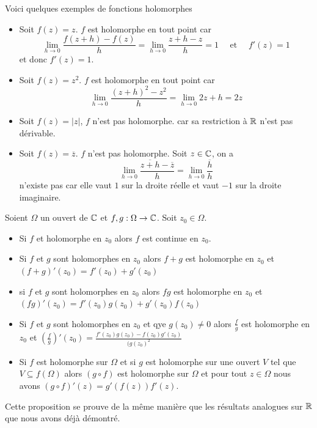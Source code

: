 \begin{exemple}
    Voici quelques exemples de fonctions holomorphes 
    \begin{itemize}
        \item Soit $f(z)=z$. $f$ est holomorphe en tout point car $$\lim_{h\to 0}\frac{f(z+h)- f(z)}{h}= \lim_{h\to 0}\frac{z+h-z}{h}=1\quad \text{ et } \quad f'(z)=1$$ et donc $f'(z) = 1$.
        \item Soit $f(z) = z^2$. $f$ est holomorphe en tout point car $$\lim_{h\to 0}\frac{(z+h)^2-z^2}{h} = \lim_{h\to 0}2z + h = 2z$$
        \item Soit $f(z)= |z|$, $f$ n'est pas holomorphe. car sa restriction à $\mathbb{R}$ n'est pas dérivable.
        \item Soit $f(z)= \overline{z}$. $f$ n'est pas holomorphe. Soit $z\in \mathbb{C}$, on a
        $$
        \lim_{h\to0}\frac{\overline{z+h}- \overline{z}}{h}=\lim_{h\to 0} \frac{\overline{h}}{h}
        $$ n'existe pas car elle vaut $1$ sur la droite réelle et vaut $-1$ sur la droite imaginaire.
    \end{itemize}
\end{exemple}
\begin{proposition}
    Soient $\Omega$ un ouvert de $\mathbb{C}$ et $f,g:\Omega \to \mathbb{C}$. Soit $z_0\in \Omega$.
    \begin{itemize}
        \item Si $f$ et holomorphe en $z_0$ alors $f$ est continue en $z_0$.
        \item Si $f$ et $g$ sont holomorphes en $z_0$ alors $f+g$ est holomorphe en $z_0$ et $(f+g)'(z_0) = f'(z_0) + g'(z_0)$
        \item si $f$ et $g$ sont holomorphes en $z_0$ alors $f g$ est holomorphe en $z_0$ et $(fg)'(z_0)= f'(z_0)g(z_0) + g'(z_0)f(z_0)$
        \item Si $f$ et $g$ sont holomorphes en $z_0$ et qye $g(z_0)\ne 0$ alors $\frac{f}{g}$ est holomorphe en $z_0$ et $\left(\frac{f}{g}\right)'(z_0) = \frac{f'(z_0)g(z_0)-f(z_0)g'(z_0)}{(g(z_0)^2}$
        \item Si $f$ est holomorphe sur $\Omega$ et si $g$ est holomorphe sur une ouvert $V$ tel que $V\subseteq f(\Omega) $ alors $(g\circ f)$ est holomorphe sur $\Omega$ et pour tout $z \in \Omega$ nous avons $(g\circ f)'(z)= g'(f(z))f'(z)$.
    \end{itemize}


\end{proposition}

Cette proposition se prouve de la même manière que les résultats analogues sur $\mathbb{R}$ que nous avons déjà démontré.

